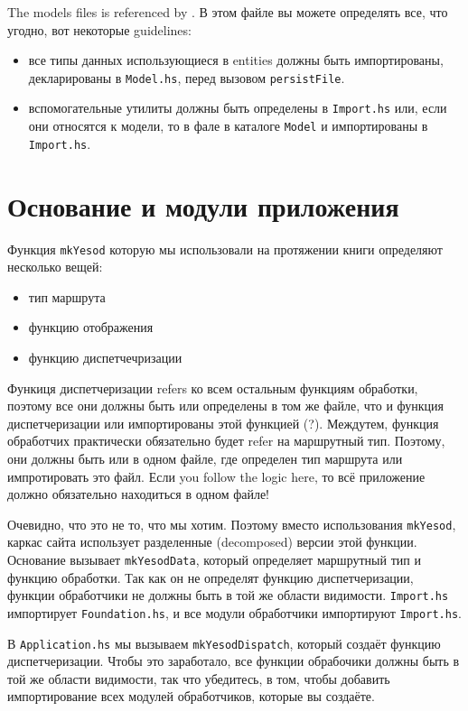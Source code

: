 The models files is referenced by . В этом файле вы можете определять все, что угодно,
вот некоторые guidelines:
\begin{itemize}
    \item все типы данных использующиеся в entities должны быть импортированы, декларированы в \texttt{Model.hs}, 
        перед вызовом \lstinline!persistFile!.
    \item вспомогательные утилиты должны быть определены в \texttt{Import.hs} или, если они относятся к модели,
        то в фале в каталоге \texttt{Model} и импортированы в \texttt{Import.hs}.
\end{itemize}

\section{Основание и модули приложения}

Функция \lstinline!mkYesod! которую мы использовали на протяжении книги определяют несколько вещей:

\begin{itemize}
  \item тип маршрута
  \item функцию отображения
  \item функцию диспетчечризации
\end{itemize}

Функиця диспетчеризации refers ко всем остальным функциям обработки, поэтому все они должны быть 
или определены в том же файле, что и функция диспетчеризации или импортированы этой функцией (?). %
Междутем, функция обработчих практически обязательно будет refer на маршрутный тип. Поэтому,
они должны быть или в одном файле, где определен тип маршрута или импротировать это файл.
Если you follow the logic here, то всё приложение должно обязательно находиться в одном файле!

Очевидно, что это не то, что мы хотим. Поэтому вместо использования \lstinline!mkYesod!, каркас 
сайта использует разделенные (decomposed) версии этой функции. Основание вызывает \lstinline!mkYesodData!,
который определяет маршрутный тип и функцию обработки. Так как он не определят функцию диспетчеризации,
функции обработчики не должны быть в той же области видимости. \texttt{Import.hs} импортирует
\texttt{Foundation.hs}, и все модули обработчики импортируют \texttt{Import.hs}.

В \texttt{Application.hs} мы вызываем \lstinline!mkYesodDispatch!, который создаёт функцию диспетчеризации.
Чтобы это заработало, все функции обрабочики должны быть в той же области видимости, так что убедитесь, в 
том, чтобы добавить импортирование всех модулей обработчиков, которые вы создаёте.

